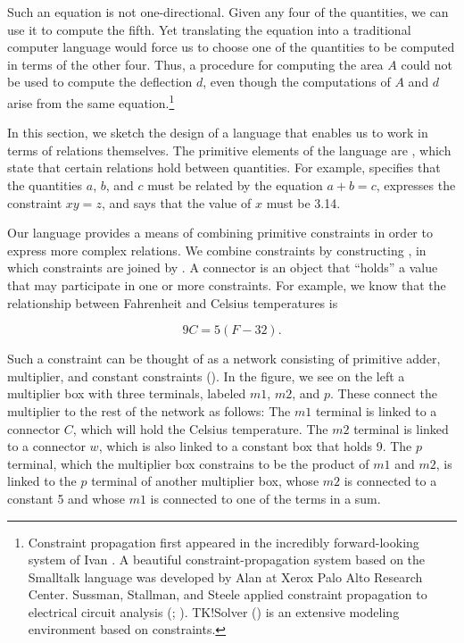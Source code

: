 Such an equation is not one-directional.  Given any four of the quantities, we
can use it to compute the fifth.  Yet translating the equation into a
traditional computer language would force us to choose one of the quantities to
be computed in terms of the other four.  Thus, a procedure for computing the
area \( A \) could not be used to compute the deflection \( d \), even though the
computations of \( A \) and \( d \) arise from the same
equation.\footnote{Constraint propagation first appeared in the incredibly
forward-looking  system of Ivan .  A
beautiful constraint-propagation system based on the Smalltalk language was
developed by Alan  at Xerox Palo Alto Research Center.  Sussman,
Stallman, and Steele applied constraint propagation to electrical circuit
analysis (; ). TK!Solver
() is an extensive modeling environment based on
constraints.}

In this section, we sketch the design of a language that enables us to work in
terms of relations themselves.  The primitive elements of the language are
, which state that certain relations hold
between quantities.  For example,  specifies that the
quantities \( a \), \( b \), and \( c \) must be related by the equation
\( a + b = c \),  expresses the constraint
\( xy = z \), and  says that the value of \( x \) must be 3.14.

Our language provides a means of combining primitive constraints in order to
express more complex relations.  We combine constraints by constructing
, in which constraints are joined by
.  A connector is an object that ``holds'' a value that may
participate in one or more constraints.  For example, we know that the
relationship between Fahrenheit and Celsius temperatures is

$$ 9C = 5(F - 32). $$

Such a constraint can be thought of as a network consisting of primitive adder,
multiplier, and constant constraints ().  In the figure, we
see on the left a multiplier box with three terminals, labeled \( {m1} \), \( {m2} \),
and \( p \).  These connect the multiplier to the rest of the network as follows:
The \( {m1} \) terminal is linked to a connector \( C \), which will hold the Celsius
temperature.  The \( {m2} \) terminal is linked to a connector \( w \), which is also
linked to a constant box that holds 9.  The \( p \) terminal, which the
multiplier box constrains to be the product of \( {m1} \) and \( {m2} \), is linked to
the \( p \) terminal of another multiplier box, whose \( {m2} \) is connected to a
constant 5 and whose \( {m1} \) is connected to one of the terms in a sum.

